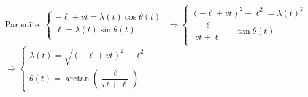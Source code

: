Par suite,
$\left\{
\begin{array}{l}
-\ell+vt  = \lambda(t) \cos \theta(t) \\
\ell = \lambda(t) \sin \theta(t) \\
\end{array}
\right.$ 
$\Rightarrow 
\left\{
\begin{array}{l}
\left(-\ell+vt\right)^2 + \ell^2   = \lambda(t)^2  \\
\dfrac{\ell}{vt+\ell} =  \tan \theta(t) \\
\end{array}
\right.$ 
$\Rightarrow 
\left\{
\begin{array}{l}
\lambda(t) = \sqrt{\left(-\ell+vt\right)^2 + \ell^2}\\
\theta(t) = \arctan \left( \dfrac{\ell}{vt+\ell} \right)
\end{array}
\right.$ 

\else
\fi


\ifprof
\else
\fi

\ifprof
\else
{}
\fi